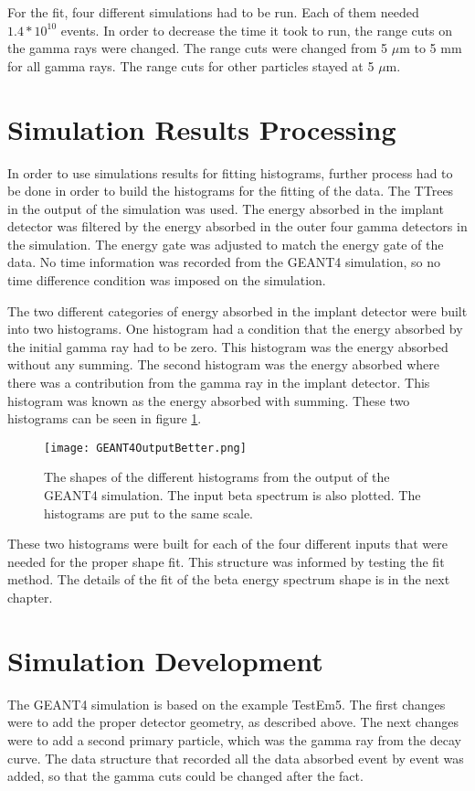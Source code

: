 \documentclass[../MaxHughesThesis.tex]{subfiles}
\begin{document}
For the fit, four different simulations had to be run.
Each of them needed $1.4 * 10^{10}$ events. 
In order to decrease the time it took to run, the range cuts on the gamma rays were changed.
The range cuts were changed from 5 $\mu$m to 5 mm for all gamma rays.
The range cuts for other particles stayed at 5 $\mu$m.

\section{Simulation Results Processing}
In order to use simulations results for fitting histograms, further process had to be done in order to build the histograms for the fitting of the data. 
The TTrees in the output of the simulation was used. 
The energy absorbed in the implant detector was filtered by the energy absorbed in the outer four gamma detectors in the simulation.
The energy gate was adjusted to match the energy gate of the data.
No time information was recorded from the GEANT4 simulation, so no time difference condition was imposed on the simulation. 

The two different categories of energy absorbed in the implant detector were built into two histograms. 
One histogram had a condition that the energy absorbed by the initial gamma ray had to be zero.
This histogram was the energy absorbed without any summing.
The second histogram was the energy absorbed where there was a contribution from the gamma ray in the implant detector.
This histogram was known as the energy absorbed with summing.
These two histograms can be seen in figure \ref{fig:GEANT4Hists}.

\begin{figure}[!htb]
	\centerline{\texttt{[image: GEANT4OutputBetter.png]}}
	\caption{The shapes of the different histograms from the output of the GEANT4 simulation.
		 The input beta spectrum is also plotted.
		 The histograms are put to the same scale.}
	\label{fig:GEANT4Hists}
\end{figure}

These two histograms were built for each of the four different inputs that were needed for the proper shape fit. 
This structure was informed by testing the fit method.
The details of the fit of the beta energy spectrum shape is in the next chapter. 

\section{Simulation Development}
The GEANT4 simulation is based on the example TestEm5.
The first changes were to add the proper detector geometry, as described above.
The next changes were to add a second primary particle, which was the gamma ray from the decay curve.
The data structure that recorded all the data absorbed event by event was added, so that the gamma cuts could be changed after the fact.
\end{document}
